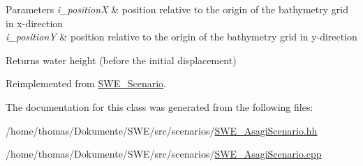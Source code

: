 \begin{DoxyParams}{Parameters}
{\em i\-\_\-position\-X} & position relative to the origin of the bathymetry grid in x-\/direction \\
\hline
{\em i\-\_\-position\-Y} & position relative to the origin of the bathymetry grid in y-\/direction \\
\hline
\end{DoxyParams}
\begin{DoxyReturn}{Returns}
water height (before the initial displacement) 
\end{DoxyReturn}


Reimplemented from \hyperlink{classSWE__Scenario}{S\-W\-E\-\_\-\-Scenario}.



The documentation for this class was generated from the following files\-:\begin{DoxyCompactItemize}
\item 
/home/thomas/\-Dokumente/\-S\-W\-E/src/scenarios/\hyperlink{SWE__AsagiScenario_8hh}{S\-W\-E\-\_\-\-Asagi\-Scenario.\-hh}\item 
/home/thomas/\-Dokumente/\-S\-W\-E/src/scenarios/\hyperlink{SWE__AsagiScenario_8cpp}{S\-W\-E\-\_\-\-Asagi\-Scenario.\-cpp}\end{DoxyCompactItemize}
